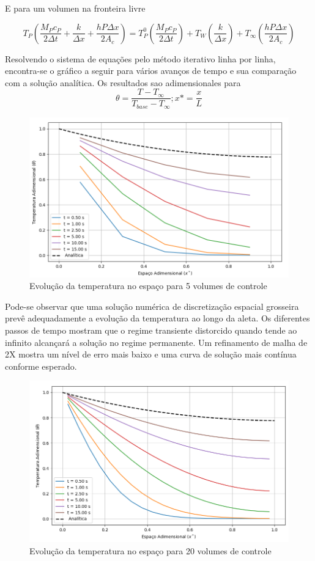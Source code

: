 \documentclass[]{article}
\begin{document}
E para um volumen na fronteira livre

\begin{equation}
	T_P \left( \frac{M_P c_P}{2 \Delta t} + \frac{k}{\Delta x} + \frac{hP \Delta x}{2 A_c} \right) =
	T_P^0 \left( \frac{M_P c_P}{2 \Delta t} \right) +
	T_W \left( \frac{k}{\Delta x} \right) +
	T_\infty \left( \frac{hP \Delta x}{2 A_c} \right)
\end{equation}

Resolvendo o sistema de equações pelo método iterativo linha por linha, encontra-se o gráfico a seguir para vários avanços de tempo e sua comparação com a solução analítica. Os resultados sao adimensionales para \\


\begin{equation}
	\theta = \frac{T - T_\infty}{T_{base} - T_\infty} ; x* = \frac{x}{L}
\end{equation}

\begin{figure}[H]
	\centering
	\includegraphics[width=.65\textwidth]{figures/310-2-2}
	\caption{Evolução da temperatura no espaço para 5 volumes de controle}
\end{figure}

Pode-se observar que uma solução numérica de discretização espacial grosseira prevê adequadamente a evolução da temperatura ao longo da aleta. Os diferentes passos de tempo mostram que o regime transiente distorcido quando tende ao infinito alcançará a solução no regime permanente. Um refinamento de malha de 2X mostra um nível de erro mais baixo e uma curva de solução mais contínua conforme esperado.

\begin{figure}[H]
	\centering
	\includegraphics[width=.65\textwidth]{figures/310-3}
	\caption{Evolução da temperatura no espaço para 20 volumes de controle}
\end{figure}
\end{document}
